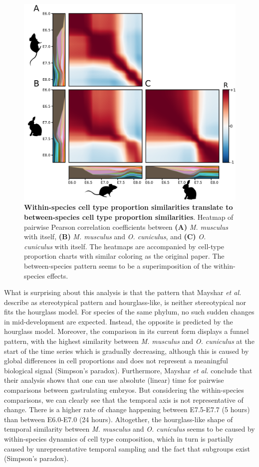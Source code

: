 \begin{figure}
    \center
    \includegraphics[width=0.8\linewidth]{ch.hourglass/images/mouse_rabbit_cellproportions.png}
    \caption{\textbf{Within-species cell type proportion similarities translate to between-species cell type proportion similarities}. Heatmap of pairwise Pearson correlation coefficients between \textbf{(A)} \textit{M. musculus} with itself, \textbf{(B)} \textit{M. musculus} and \textit{O. cuniculus}, and \textbf{(C)} \textit{O. cuniculus} with itself. The heatmaps are accompanied by cell-type proportion charts with similar coloring as the original paper. The between-species pattern seems to be a superimposition of the within-species effects.}
    \label{fig:cellproportions}
\end{figure}

What is surprising about this analysis is that the pattern that Mayshar \textit{et al.} describe as stereotypical pattern and hourglass-like, is neither stereotypical nor fits the hourglass model. For species of the same phylum, no such sudden changes in mid-development are expected. Instead, the opposite is predicted by the hourglass model. Moreover, the comparison in its current form displays a funnel pattern, with the highest similarity between \textit{M. musculus} and \textit{O. cuniculus} at the start of the time series which is gradually decreasing, although this is caused by global differences in cell proportions and does not represent a meaningful biological signal (Simpson's paradox). Furthermore, Mayshar \textit{et al.} conclude that their analysis shows that one can use absolute (linear) time for pairwise comparisons between gastrulating embryos. But considering the within-species comparisons, we can clearly see that the temporal axis is not representative of change. There is a higher rate of change happening between E7.5-E7.7 (5 hours) than between E6.0-E7.0 (24 hours). Altogether, the hourglass-like shape of temporal similarity between  \textit{M. musculus} and \textit{O. cuniculus} seems to be caused by within-species dynamics of cell type composition, which in turn is partially caused by unrepresentative temporal sampling and the fact that subgroups exist (Simpson's paradox).

